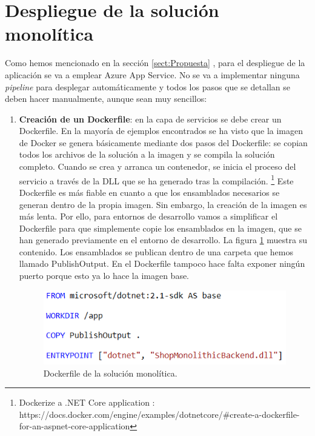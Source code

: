 \documentclass[11pt,spanish,listoffigures]{tfgetsinf}
\begin{document}
\section{Despliegue de la solución monolítica}

Como hemos mencionado en la sección \ref{sect:Propuesta} , para el despliegue de la aplicación se va a emplear Azure App Service. No se va a implementar ninguna \textit{pipeline} para desplegar automáticamente y todos los pasos que se detallan se deben hacer manualmente, aunque sean muy sencillos:

\begin{enumerate}

\item \textbf{Creación de un Dockerfile}: en la capa de servicios se debe crear un Dockerfile. En la mayoría de ejemplos encontrados se ha visto que la imagen de Docker se genera básicamente mediante dos pasos del Dockerfile: se copian todos los archivos de la solución a la imagen y se compila la solución completo. Cuando se crea y arranca un contenedor, se inicia el proceso del servicio a través de la DLL que se ha generado tras la compilación. \footnote{ Dockerize a .NET Core application
: https://docs.docker.com/engine/examples/dotnetcore/\#create-a-dockerfile-for-an-aspnet-core-application} Este Dockerfile es más fiable en cuanto a que los ensamblados necesarios se generan dentro de la propia imagen. Sin embargo, la creación de la imagen es más lenta. Por ello, para entornos de desarrollo vamos a simplificar el Dockerfile para que simplemente copie los ensamblados en la imagen, que se han generado previamente en el entorno de desarrollo. La figura \ref{fig:Dockerfile} muestra su contenido. Los ensamblados se publican dentro de una carpeta que hemos llamado PublishOutput. En el Dockerfile tampoco hace falta exponer ningún puerto porque esto ya lo hace la imagen base.

\begin{figure}[h]
\centering
\includegraphics[scale=0.8]{Dockerfile}
\caption{Dockerfile de la solución monolítica.}
\label{fig:Dockerfile}
\end{figure}


\end{enumerate}
\end{document}
